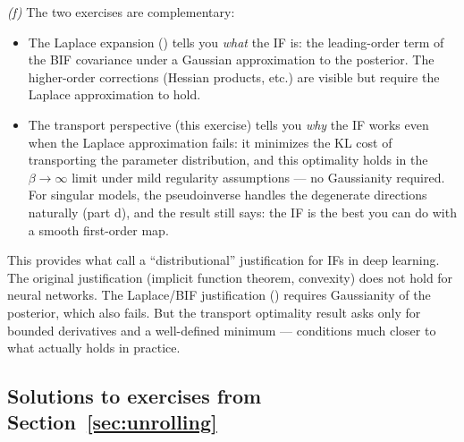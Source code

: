 \documentclass[11pt]{article}
\begin{document}
\begin{solution}[ex:bif-ot]
\textit{(f)} The two exercises are complementary:
\begin{itemize}
  \item The Laplace expansion () tells you \emph{what} the IF is: the leading-order term of the BIF covariance under a Gaussian approximation to the posterior. The higher-order corrections (Hessian products, etc.) are visible but require the Laplace approximation to hold.
  \item The transport perspective (this exercise) tells you \emph{why} the IF works even when the Laplace approximation fails: it minimizes the KL cost of transporting the parameter distribution, and this optimality holds in the $\beta\to\infty$ limit under mild regularity assumptions --- no Gaussianity required. For singular models, the pseudoinverse handles the degenerate directions naturally (part d), and the result still says: the IF is the best you can do with a smooth first-order map.
\end{itemize}
This provides what \citet{mlodozeniec2025distributional} call a ``distributional'' justification for IFs in deep learning. The original justification (implicit function theorem, convexity) does not hold for neural networks. The Laplace/BIF justification () requires Gaussianity of the posterior, which also fails. But the transport optimality result asks only for bounded derivatives and a well-defined minimum --- conditions much closer to what actually holds in practice.

\end{solution}

\begin{pdfonly}\begin{solutionsonly}
\subsection{Solutions to exercises from Section~\ref{sec:unrolling}}
\end{solutionsonly}\end{pdfonly}
\end{document}
